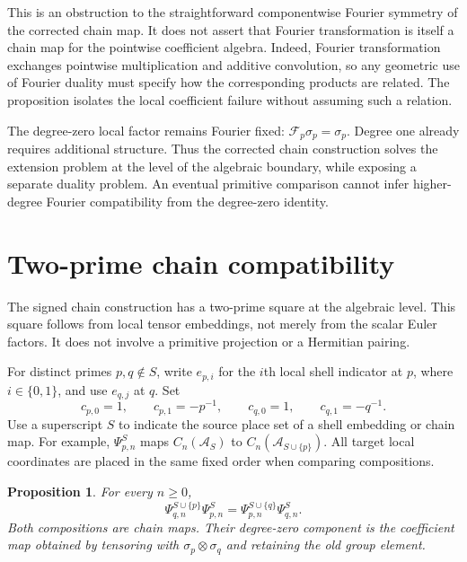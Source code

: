 \documentclass[11pt,letterpaper]{article}
\newtheorem{proposition}[theorem]{Proposition}
\theoremstyle{definition}
\theoremstyle{remark}
\begin{document}
This is an obstruction to the straightforward componentwise
Fourier symmetry of the corrected chain map. It does not
assert that Fourier transformation is itself a chain map
for the pointwise coefficient algebra. Indeed, Fourier
transformation exchanges pointwise multiplication and
additive convolution, so any geometric use of Fourier
duality must specify how the corresponding products are
related. The proposition isolates the local coefficient
failure without assuming such a relation.

The degree-zero local factor remains Fourier fixed:
$\mathscr F_p\sigma_p=\sigma_p$. Degree one already
requires additional structure. Thus the corrected chain
construction solves the extension problem at the level
of the algebraic boundary, while exposing a separate
duality problem. An eventual primitive comparison cannot
infer higher-degree Fourier compatibility from the
degree-zero identity.

\section{Two-prime chain compatibility}

The signed chain construction has a two-prime square at the
algebraic level. This square follows from local tensor embeddings,
not merely from the scalar Euler factors. It does not involve a
primitive projection or a Hermitian pairing.

For distinct primes $p,q\notin S$, write $e_{p,i}$ for the
$i$th local shell indicator at $p$, where $i\in\{0,1\}$,
and use $e_{q,j}$ at $q$. Set
\begin{equation}\label{eq:chain-coefficients}
 c_{p,0}=1,\qquad c_{p,1}=-p^{-1},\qquad
 c_{q,0}=1,\qquad c_{q,1}=-q^{-1}.
\end{equation}
Use a superscript $S$ to indicate the source place set of a
shell embedding or chain map. For example,
$\Psi_{p,n}^{S}$ maps $C_n(\mathcal A_S)$ to
$C_n(\mathcal A_{S\cup\{p\}})$.
All target local coordinates are placed in the same fixed
order when comparing compositions.

\begin{proposition}\label{prop:chain-square}
For every $n\ge0$,
\begin{equation}\label{eq:chain-square}
 \Psi_{q,n}^{S\cup\{p\}}\Psi_{p,n}^{S}
     =\Psi_{p,n}^{S\cup\{q\}}\Psi_{q,n}^{S}.
\end{equation}
Both compositions are chain maps. Their degree-zero
component is the coefficient map obtained by tensoring
with $\sigma_p\otimes\sigma_q$ and retaining the old
group element.
\end{proposition}
\end{document}
